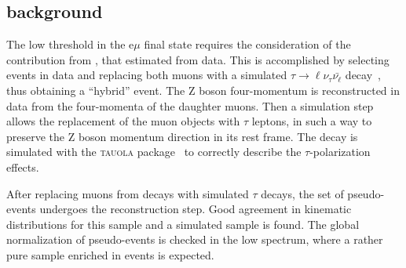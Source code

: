 \subsection{\dytt background\label{sec:DYtautaubkg}}

The low \MET threshold in the e$\mu$ final state requires the consideration of the contribution from \dytt, that estimated from data.
This is accomplished by selecting \dymm events in data and replacing both muons with a simulated
$\tau\to \ell\nu_\tau\bar{\nu_\ell}$ decay~\cite{Chatrchyan:2013iaa}, thus obtaining a ``hybrid'' event. The Z boson four-momentum is reconstructed in data from the four-momenta of the daughter muons. Then a simulation step allows the replacement of the muon objects with $\tau$ leptons, in such a way to preserve the Z boson momentum direction in its rest frame. The \dytt decay is simulated with the \textsc{tauola} package~\cite{Jadach:1990mz} to correctly describe the $\tau$-polarization effects.

After replacing muons from \dymm decays with simulated $\tau$ decays, the set of pseudo-\dytt events undergoes the reconstruction step. Good agreement in kinematic distributions for this sample
and a simulated \dytt sample is found. The global normalization of pseudo-\dytt events is checked in the low \mt spectrum, where a rather pure sample enriched in \dytt events is expected.

